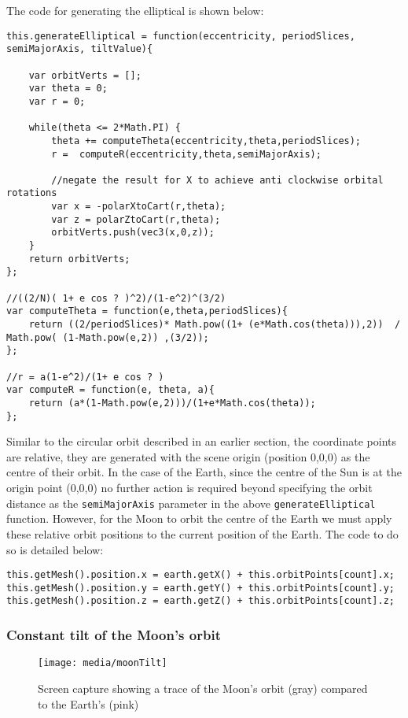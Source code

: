 \documentclass[titlepage]{article}
\begin{document}
The code for generating the elliptical is shown below:

\begin{lstlisting}[caption=Above code can be found in OrbitUtils.js and is adapted from the formulas given in the assignment brief.]
this.generateElliptical = function(eccentricity, periodSlices, semiMajorAxis, tiltValue){

    var orbitVerts = [];
    var theta = 0;
    var r = 0;

    while(theta <= 2*Math.PI) {
        theta += computeTheta(eccentricity,theta,periodSlices);
        r =  computeR(eccentricity,theta,semiMajorAxis);

        //negate the result for X to achieve anti clockwise orbital rotations
        var x = -polarXtoCart(r,theta);
        var z = polarZtoCart(r,theta);
        orbitVerts.push(vec3(x,0,z));
    }
    return orbitVerts;
};

//((2/N)( 1+ e cos ? )^2)/(1-e^2)^(3/2)
var computeTheta = function(e,theta,periodSlices){
    return ((2/periodSlices)* Math.pow((1+ (e*Math.cos(theta))),2))  / Math.pow( (1-Math.pow(e,2)) ,(3/2));
};

//r = a(1-e^2)/(1+ e cos ? )
var computeR = function(e, theta, a){
    return (a*(1-Math.pow(e,2)))/(1+e*Math.cos(theta));
};
\end{lstlisting}

Similar to the circular orbit described in an earlier section, the coordinate points are relative, they are generated with the scene origin (position 0,0,0) as the centre of their orbit. In the case of the Earth, since the centre of the Sun is at the origin point (0,0,0) no further action is required beyond specifying the orbit distance as the \texttt{semiMajorAxis} parameter in the above \texttt{generateElliptical} function. However, for the Moon to orbit the centre of the Earth we must apply these relative orbit positions to the current position of the Earth. The code to do so is detailed below:
\begin{lstlisting}[caption=Code taken from Moon.js showing the moon mesh position being set as that of the Earth plus the relative axis positions from the orbital point list]
this.getMesh().position.x = earth.getX() + this.orbitPoints[count].x;
this.getMesh().position.y = earth.getY() + this.orbitPoints[count].y;
this.getMesh().position.z = earth.getZ() + this.orbitPoints[count].z;

\end{lstlisting}


\subsubsection{Constant tilt of the Moon’s orbit}
\begin{figure}[h!]
                \centering
                \texttt{[image: media/moonTilt]}
                \caption{Screen capture showing a trace of the Moon's orbit (gray) compared to the Earth's (pink)}
\end{figure}
\end{document}
